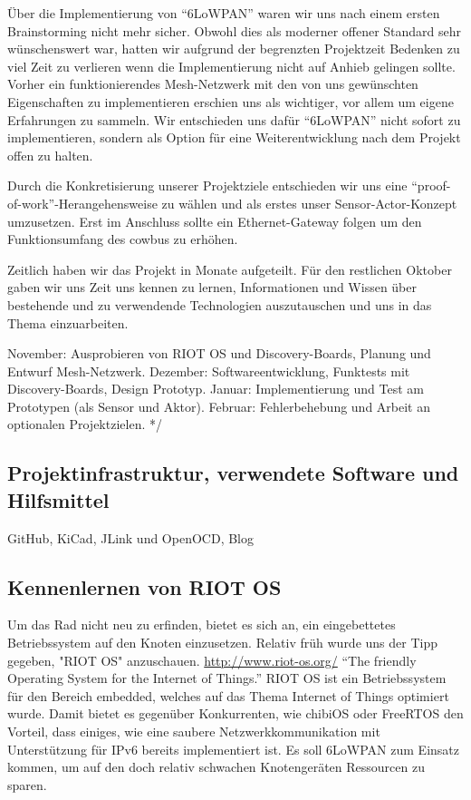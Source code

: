 \documentclass{IEEEtran}
\begin{document}
        Über die Implementierung von \enquote{6LoWPAN} waren wir uns nach einem ersten 
        Brainstorming nicht mehr sicher. Obwohl dies als moderner offener Standard 
        sehr wünschenswert war, hatten wir aufgrund der begrenzten Projektzeit Bedenken 
        zu viel Zeit zu verlieren wenn die Implementierung nicht auf Anhieb gelingen 
        sollte. Vorher ein funktionierendes Mesh-Netzwerk mit den von uns gewünschten 
        Eigenschaften zu implementieren erschien uns als wichtiger, vor allem um 
        eigene Erfahrungen zu sammeln. Wir entschieden uns dafür \enquote{6LoWPAN} 
        nicht sofort zu implementieren, sondern als Option für eine Weiterentwicklung 
        nach dem Projekt offen zu halten.

        Durch die Konkretisierung unserer Projektziele entschieden wir uns eine 
        \enquote{proof-of-work}-Herangehensweise zu wählen und als erstes unser 
        Sensor-Actor-Konzept umzusetzen. Erst im Anschluss sollte ein 
        Ethernet-Gateway folgen um den Funktionsumfang des cowbus zu erhöhen.

        Zeitlich haben wir das Projekt in Monate aufgeteilt. Für den restlichen Oktober 
        gaben wir uns Zeit uns kennen zu lernen, Informationen und Wissen über bestehende 
        und zu verwendende Technologien auszutauschen und uns in das Thema einzuarbeiten.

        November: Ausprobieren von RIOT OS und Discovery-Boards, Planung und 
        Entwurf Mesh-Netzwerk.
        Dezember: Softwareentwicklung, Funktests mit Discovery-Boards, Design Prototyp.
        Januar: Implementierung und Test am Prototypen (als Sensor und Aktor).
        Februar: Fehlerbehebung und Arbeit an optionalen Projektzielen. 
        */

    \subsection{Projektinfrastruktur, verwendete Software und Hilfsmittel}
        
        GitHub, KiCad, JLink und OpenOCD, Blog

    \subsection{Kennenlernen von RIOT OS}

        Um das Rad nicht neu zu erfinden, bietet es sich an, ein eingebettetes 
        Betriebssystem auf den Knoten einzusetzen. Relativ früh wurde uns der Tipp 
        gegeben, "RIOT OS" anzuschauen. \url{http://www.riot-os.org/} 
        \enquote{The friendly Operating System for the Internet of Things.}
        RIOT OS ist ein Betriebssystem für den Bereich embedded, welches auf das 
        Thema Internet of Things optimiert wurde. 
        Damit bietet es gegenüber Konkurrenten, wie chibiOS oder FreeRTOS den Vorteil, 
        dass einiges, wie eine saubere Netzwerkkommunikation mit Unterstützung für 
        IPv6 bereits implementiert ist. 
        Es soll 6LoWPAN zum Einsatz kommen, um auf den doch relativ schwachen 
        Knotengeräten Ressourcen zu sparen.
\end{document}

